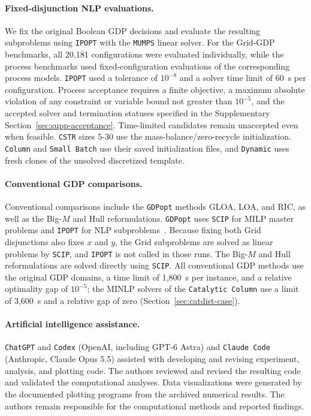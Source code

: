\documentclass{article}
\begin{document}
\paragraph{Fixed-disjunction NLP evaluations.}
We fix the original Boolean GDP decisions and evaluate the resulting subproblems using \texttt{IPOPT} with the \texttt{MUMPS} linear solver.
For the Grid-GDP benchmarks, all 20,181 configurations were evaluated individually, while the process benchmarks used fixed-configuration evaluations of the corresponding process models.
\texttt{IPOPT} used a tolerance of \(10^{-8}\) and a solver time limit of 60~s per configuration.
Process acceptance requires a finite objective, a maximum absolute violation of any constraint or variable bound not greater than \(10^{-5}\), and the accepted solver and termination statuses specified in the Supplementary Section~\ref{sec:supp-acceptance}.
Time-limited candidates remain unaccepted even when feasible.
\texttt{CSTR} sizes 5-30 use the mass-balance/zero-recycle initialization.
\texttt{Column} and \texttt{Small Batch} use their saved initialization files, and \texttt{Dynamic} uses fresh clones of the unsolved discretized template.

\paragraph{Conventional GDP comparisons.}
Conventional comparisons include the \texttt{GDPopt} methods GLOA, LOA, and RIC, as well as the Big-\(M\) and Hull reformulations.
\texttt{GDPopt} uses \texttt{SCIP} for MILP master problems and \texttt{IPOPT} for NLP subproblems~\citep{chen2022pyomogdp,pyomoGDPopt}.
Because fixing both Grid disjunctions also fixes \(x\) and \(y\), the Grid subproblems are solved as linear problems by \texttt{SCIP}, and \texttt{IPOPT} is not called in those runs.
The Big-\(M\) and Hull reformulations are solved directly using \texttt{SCIP}.
All conventional GDP methods use the original GDP domains, a time limit of 1,800~s per instance, and a relative optimality gap of \(10^{-5}\); the MINLP solvers of the \texttt{Catalytic Column} use a limit of 3,600~s and a relative gap of zero (Section~\ref{sec:catdist-case}).

\paragraph{Artificial intelligence assistance.}
\texttt{ChatGPT} and \texttt{Codex} (OpenAI, including GPT-6 Astra) and \texttt{Claude Code} (Anthropic, Claude Opus 5.5) assisted with developing and revising experiment, analysis, and plotting code.
The authors reviewed and revised the resulting code and validated the computational analyses.
Data visualizations were generated by the documented plotting programs from the archived numerical results.
The authors remain responsible for the computational methods and reported findings.
\end{document}
